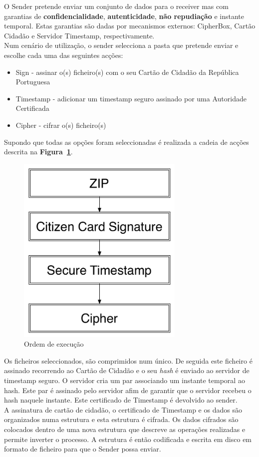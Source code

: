 O Sender pretende enviar um conjunto de dados para o receiver mas com garantias de \textbf{confidencialidade}, \textbf{autenticidade}, \textbf{não repudiação} e instante temporal. Estas garantias são dadas por mecanismos externos: CipherBox, Cartão Cidadão e Servidor Timestamp, respectivamente.\\

Num cenário de utilização, o sender selecciona a pasta que pretende enviar e escolhe cada uma das seguintes acções:
\begin{itemize}
\item Sign - assinar o(s) ficheiro(s) com o seu Cartão de Cidadão da República Portuguesa
\item Timestamp - adicionar um timestamp seguro assinado por uma Autoridade Certificada
\item Cipher - cifrar o(s) ficheiro(s)
\end{itemize}

Supondo que todas as opções foram seleccionadas é realizada a cadeia de acções descrita na \textbf{Figura~\ref{fig:order}}. \\

\begin{figure}[htp]
\centering 
\includegraphics[width=8cm]{./Figures/Architecture.pdf}
\caption{Ordem de execução}
\label{fig:order}
\end{figure}

Os ficheiros seleccionados, são comprimidos num único. De seguida este ficheiro é assinado recorrendo ao Cartão de Cidadão e o seu \textit{hash} é enviado ao servidor de timestamp seguro. O servidor cria um par associando um instante temporal ao hash. Este par é assinado pelo servidor afim de garantir que o servidor recebeu o hash naquele instante. Este certificado de Timestamp é devolvido ao sender.\\ 
A assinatura de cartão de cidadão, o certificado de Timestamp e os dados são organizados numa estrutura e esta estrutura é cifrada. Os dados cifrados são colocados dentro de uma nova estrutura que descreve as operações realizadas e permite inverter o processo. A estrutura é então codificada e escrita em disco em formato de ficheiro para que o Sender possa enviar. \\
 
